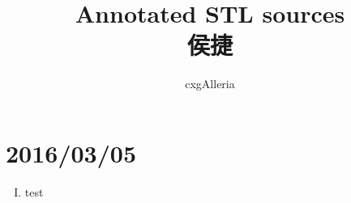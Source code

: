 \documentclass{ctexart}
\begin{document}
\title{%
	Annotated STL sources\\
		侯捷
}
\author{%
	cxgAlleria
}
\maketitle

\tableofcontents
\section[0305]{2016/03/05}
	\begin{enumerate}[I.]
		\item test
	\end{enumerate}
\end{document}
